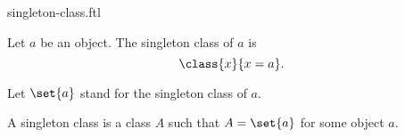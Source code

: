 \documentclass{stex}
\begin{document}
\begin{smodule}{singleton-class.ftl}

  \begin{forthel}
    \begin{definition}
      Let $a$ be an object.
      The singleton class of $a$ is
      \[\class{x}{x = a}.\]
    \end{definition}

    Let $\set{a}$ stand for the singleton class of $a$.
  \end{forthel}

  \begin{forthel}
    \begin{definition}
      A singleton class is a class $A$ such that $A = \set{a}$ for some object $a$.
    \end{definition}
  \end{forthel}
\end{smodule}
\end{document}
